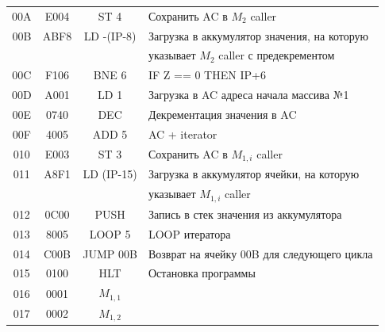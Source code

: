 \begin{center}
\begin{tabular}{|c|c|c|l|}
        00A                   & E004                  & ST 4               & Сохранить AC в $M_{2}$ caller                       \\
        00B                   & ABF8                  & LD -(IP-8)         & Загрузка в аккумулятор значения, на которую       \\
        &                       &                    & указывает $M_2$ caller с предекрементом           \\
        00C                   & F106                  & BNE 6              & IF Z == 0 THEN IP+6                               \\
        00D                   & A001                  & LD 1               & Загрузка в AC адреса начала массива №1            \\
        00E                   & 0740                  & DEC                & Декрементация значения в AC                       \\
        00F                   & 4005                  & ADD 5              & AC + iterator                                     \\
        010                   & E003                  & ST 3               & Сохранить AC в $M_{1,i}$ caller                     \\
        011                   & A8F1                  & LD (IP-15)         & Загрузка в аккумулятор ячейки, на которую         \\
        &                       &                    & указывает $M_{1,i}$ caller                        \\
        012                   & 0C00                  & PUSH               & Запись в стек значения из аккумулятора            \\
        013                   & 8005                  & LOOP 5             & LOOP итератора                                    \\
        014                   & C00B                  & JUMP 00B           & Возврат на ячейку 00B для следующего цикла        \\
        015                   & 0100                  & HLT                & Остановка программы                               \\
        \hline
        016                   & 0001                  & $M_{1,1}$          &                                                   \\
        017                   & 0002                  & $M_{1,2}$          &                                                   \\

\end{tabular}
\end{center}
